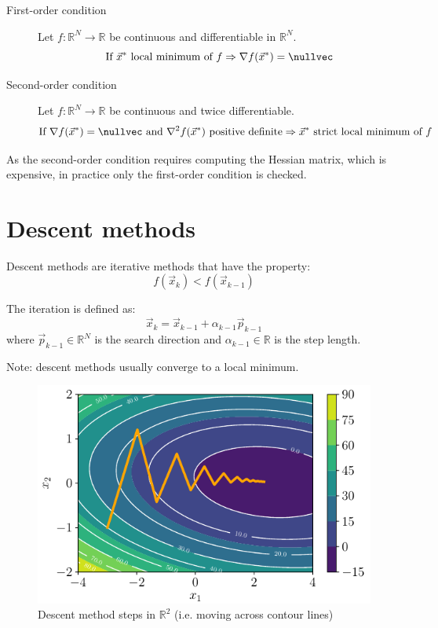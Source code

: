 \begin{description}
    \item[First-order condition] 
        Let $f: \mathbb{R}^N \rightarrow \mathbb{R}$ be continuous and differentiable in $\mathbb{R}^N$.
        \[ \text{If } \vec{x}^* \text{ local minimum of } f \Rightarrow \nabla f(\vec{x}^*) = \nullvec \]

    \item[Second-order condition] 
        Let $f: \mathbb{R}^N \rightarrow \mathbb{R}$ be continuous and twice differentiable.
        \[ 
            \text{If } \nabla f(\vec{x}^*) = \nullvec \text{ and } \nabla^2 f(\vec{x}^*) \text{ positive definite} \Rightarrow 
            \vec{x}^* \text{ strict local minimum of } f 
        \]
\end{description}

As the second-order condition requires computing the Hessian matrix, which is expensive, in practice only the first-order condition is checked.



\section{Descent methods}

Descent methods are iterative methods that have the property:
\[ f(\vec{x}_k) < f(\vec{x}_{k-1}) \]

The iteration is defined as:
\[ \vec{x}_k = \vec{x}_{k-1} + \alpha_{k-1}\vec{p}_{k-1} \]
where $\vec{p}_{k-1} \in \mathbb{R}^N$ is the search direction and 
$\alpha_{k-1} \in \mathbb{R}$ is the step length.

Note: descent methods usually converge to a local minimum.

\begin{figure}
    \centering
    \includegraphics[width=0.5\linewidth]{img/_gradient_contour.pdf}
    \caption{Descent method steps in $\mathbb{R}^2$ (i.e. moving across contour lines)}
\end{figure}


